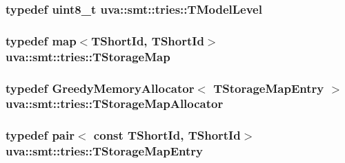 \subsubsection[{T\+Model\+Level}]{\setlength{\rightskip}{0pt plus 5cm}typedef uint8\+\_\+t {\bf uva\+::smt\+::tries\+::\+T\+Model\+Level}}\label{namespaceuva_1_1smt_1_1tries_a20577a44b3a42d26524250634379b7cb}
\hypertarget{namespaceuva_1_1smt_1_1tries_adcb2d50a97c40fe1a3509d9f798c1d3b}{}
\subsubsection[{T\+Storage\+Map}]{\setlength{\rightskip}{0pt plus 5cm}typedef map$<${\bf T\+Short\+Id}, {\bf T\+Short\+Id}$>$ {\bf uva\+::smt\+::tries\+::\+T\+Storage\+Map}}\label{namespaceuva_1_1smt_1_1tries_adcb2d50a97c40fe1a3509d9f798c1d3b}
\hypertarget{namespaceuva_1_1smt_1_1tries_a80642b3331407e41b0aca518e3a1ac31}{}
\subsubsection[{T\+Storage\+Map\+Allocator}]{\setlength{\rightskip}{0pt plus 5cm}typedef {\bf Greedy\+Memory\+Allocator}$<$ {\bf T\+Storage\+Map\+Entry} $>$ {\bf uva\+::smt\+::tries\+::\+T\+Storage\+Map\+Allocator}}\label{namespaceuva_1_1smt_1_1tries_a80642b3331407e41b0aca518e3a1ac31}
\hypertarget{namespaceuva_1_1smt_1_1tries_affc598132a51209f50d781cf01733996}{}
\subsubsection[{T\+Storage\+Map\+Entry}]{\setlength{\rightskip}{0pt plus 5cm}typedef pair$<$ const {\bf T\+Short\+Id}, {\bf T\+Short\+Id}$>$ {\bf uva\+::smt\+::tries\+::\+T\+Storage\+Map\+Entry}}\label{namespaceuva_1_1smt_1_1tries_affc598132a51209f50d781cf01733996}
\hypertarget{namespaceuva_1_1smt_1_1tries_a51747124086c47f6b3eb7b66599dbc81}{}
